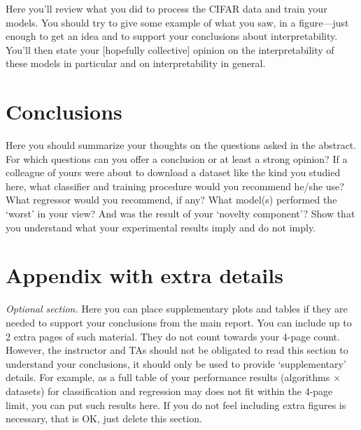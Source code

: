 \documentclass[10pt,twocolumn,letterpaper]{article}
\begin{document}
Here you'll review what you did to process the CIFAR data and train your models.
You should try to give some example of what you saw, in a figure---just enough to get
an idea and to support your conclusions about interpretability.
You'll then state your [hopefully collective] opinion on the interpretability of
these models in particular and on interpretability in general.



\section{Conclusions}

Here you should summarize your thoughts on the questions asked in the abstract.
For which questions can you offer a conclusion or at least a strong opinion?
If a colleague of yours were about to download a dataset like the kind you studied here,
what classifier and training procedure would you recommend he/she use?
What regressor would you recommend, if any?
What model(s) performed the `worst' in your view?
And was the result of your `novelty component'?
Show that you understand what your experimental results imply and do not imply.



\appendix

\section{Appendix with extra details}

{\em Optional section.} Here you can place supplementary plots and tables if they are needed to
support your conclusions from the main report.
You can include up to 2 extra pages of such material.
They do not count towards your 4-page count.
However, the instructor and TAs should not be obligated to read this
section to understand your conclusions, it should only be used to provide `supplementary' details.
For example, as a full table of your performance results (algorithms $\times$ datasets)
for classification and regression may does not fit within the 4-page limit,
you can put such results here.
If you do not feel including extra figures is necessary, that is OK, just delete this section.


\end{document}
